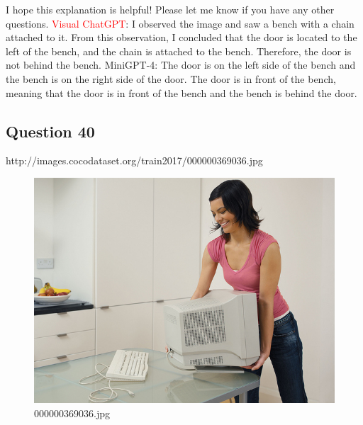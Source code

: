 \begin{enumerate}
        I hope this explanation is helpful! Please let me know if you have any other questions.
        \subitem \textcolor{red}{Visual ChatGPT}: I observed the image and saw a bench with a chain attached to it. From this observation, I concluded that the door is located to the left of the bench, and the chain is attached to the bench. Therefore, the door is not behind the bench.
        \subitem MiniGPT-4: The door is on the left side of the bench and the bench is on the right side of the door. The door is in front of the bench, meaning that the door is in front of the bench and the bench is behind the door.
    \end{enumerate}
    \subsection*{Question 40}
    http://images.cocodataset.org/train2017/000000369036.jpg
    \begin{figure}[h]
        \centering
        \includegraphics[width=0.8\linewidth]{../image set/easy/000000369036.jpg}
        \caption{000000369036.jpg}
    \end{figure}
